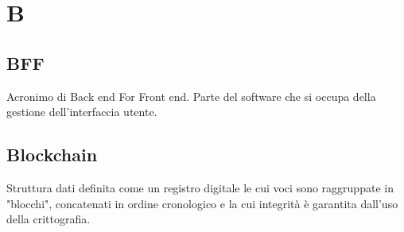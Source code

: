 \section*{B}
\markright{}
\subsection*{BFF}
Acronimo di Back end For Front end. Parte del software che si occupa della gestione dell'interfaccia utente.
\subsection*{Blockchain}
Struttura dati definita come un registro digitale le cui voci sono raggruppate in "blocchi", concatenati in ordine cronologico e la cui integrità è garantita dall'uso della crittografia.